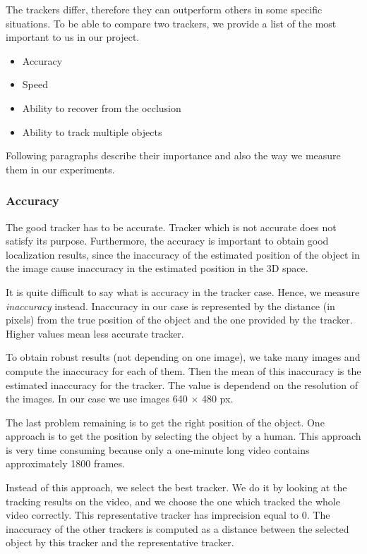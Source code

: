 The trackers differ, therefore they can outperform others in some specific
situations. To be able to compare two trackers, we provide a list of the most
important to us in our project.

\begin{itemize}
	\item Accuracy
	\item Speed
	\item Ability to recover from the occlusion
	\item Ability to track multiple objects
\end{itemize}

Following paragraphs describe their importance and also the way we measure them
in our experiments.

\subsubsection*{Accuracy}

The good tracker has to be accurate. Tracker which is not accurate does not
satisfy its purpose. Furthermore, the accuracy is important to obtain good
localization results, since the inaccuracy of the estimated position of the
object in the image cause inaccuracy in the estimated position in the 3D space.

It is quite difficult to say what is accuracy in the tracker case. Hence, we
measure \emph{inaccuracy} instead. Inaccuracy in our case is represented by the
distance (in pixels) from the true position of the object and the one provided
by the tracker. Higher values mean less accurate tracker.

To obtain robust results (not depending on one image), we take many images and
compute the inaccuracy for each of them. Then the mean of this inaccuracy is
the estimated inaccuracy for the tracker. The value is dependend on the
resolution of the images. In our case we use images 640 $\times$ 480 px.

The last problem remaining is to get the right position of the object. One
approach is to get the position by selecting the object by a human. This
approach is very time consuming because only a one-minute long video contains
approximately 1800 frames.

Instead of this approach, we select the best tracker. We do it by looking at
the tracking results on the video, and we choose the one which tracked the
whole video correctly. This representative tracker has imprecision equal to 0.
The inaccuracy of the other trackers is computed as a distance between the
selected object by this tracker and the representative tracker. 

